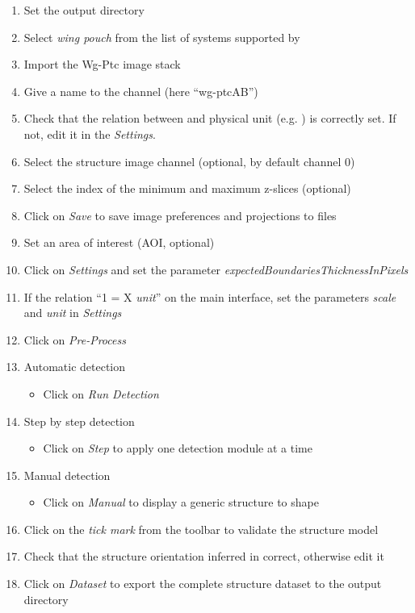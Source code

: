 \begin{enumerate}
 \item Set the output directory
 \item Select \textit{\droso wing pouch} from the list of systems supported by \wingj
 \item Import the Wg-Ptc image stack
 \item Give a name to the channel (here ``wg-ptcAB'')
 \item Check that the relation between \px and physical unit (e.g. \mum) is correctly set. If not, edit it in the \emph{Settings}.
 \item Select the structure image channel (optional, by default channel 0)
 \item Select the index of the minimum and maximum z-slices (optional)
 \item Click on \textit{Save} to save image preferences and projections to files
 \item Set an area of interest (AOI, optional)
 \item Click on \textit{Settings} and set the parameter \textit{expectedBoundariesThicknessInPixels}
 \item If the relation ``1 \px = X \textit{unit}'' on the main interface, set the parameters \textit{scale} and \textit{unit} in \textit{Settings}
 \item Click on \textit{Pre-Process}
 \item Automatic detection
    \begin{itemize}
     \item Click on \textit{Run Detection}
    \end{itemize}
 \item Step by step detection
    \begin{itemize}
     \item Click on \textit{Step} to apply one detection module at a time
    \end{itemize}
 \item Manual detection
    \begin{itemize}
     \item Click on \textit{Manual} to display a generic structure to shape
    \end{itemize}
 \item Click on the \textit{tick mark} from the \ij toolbar to validate the structure model
 \item Check that the structure orientation inferred in correct, otherwise edit it
 \item Click on \textit{Dataset} to export the complete structure dataset to the output directory
\end{enumerate}

